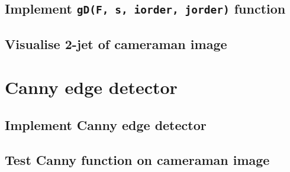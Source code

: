 \documentclass[abstract=true]{scrartcl}
\begin{document}
    

    \subsection{Implement \texttt{gD(F, s, iorder, jorder)} function}

    \subsection{Visualise 2-jet of cameraman image}



\section{Canny edge detector}

    \subsection{Implement Canny edge detector}

    \subsection{Test Canny function on cameraman image}


\end{document}
